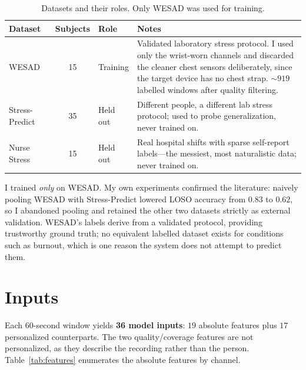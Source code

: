 \documentclass[11pt,a4paper]{article}
\newcommand{\kpi}[1]{\textbf{#1}}
\begin{document}
\begin{table}[t]
\centering
\caption{Datasets and their roles. Only WESAD was used for training.}
\label{tab:data}
\footnotesize
\renewcommand{\arraystretch}{1.2}
\begin{tabular}{p{2.5cm} c p{2.0cm} p{6.0cm}}
\toprule
\textbf{Dataset} & \textbf{Subjects} & \textbf{Role} & \textbf{Notes} \\
\midrule
\rowcolor{rowalt}
WESAD~\cite{schmidt2018wesad} & 15 & Training & Validated laboratory stress protocol. I used only the
wrist-worn channels and discarded the cleaner chest sensors deliberately, since the target device
has no chest strap. $\sim\!919$ labelled windows after quality filtering. \\
Stress-Predict~\cite{iqbal2022stresspredict} & 35 & Held out & Different people, a different lab
stress protocol; used to probe generalization, never trained on. \\
\rowcolor{rowalt}
Nurse Stress~\cite{hosseini2022nurse} & 15 & Held out & Real hospital shifts with sparse self-report
labels---the messiest, most naturalistic data; never trained on. \\
\bottomrule
\end{tabular}
\end{table}

I trained \emph{only} on WESAD. My own experiments confirmed the literature: naively pooling WESAD
with Stress-Predict lowered LOSO accuracy from $0.83$ to $0.62$, so I abandoned pooling and retained
the other two datasets strictly as external validation. WESAD's labels derive from a validated
protocol, providing trustworthy ground truth; no equivalent labelled dataset exists for conditions
such as burnout, which is one reason the system does not attempt to predict them.

\section{Inputs}
\label{sec:inputs}

Each $60$-second window yields \kpi{36 model inputs}: $19$ absolute features plus $17$ personalized
counterparts. The two quality/coverage features are not personalized, as they describe the recording
rather than the person. Table~\ref{tab:features} enumerates the absolute features by channel.
\end{document}
